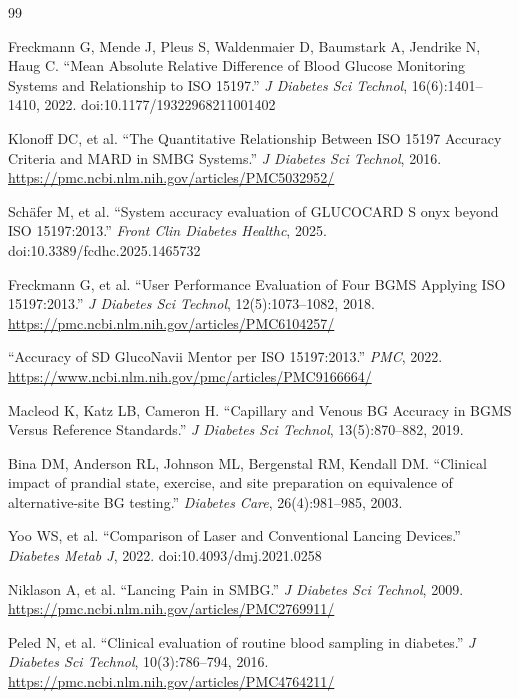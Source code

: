 \begin{thebibliography}{99}

Freckmann G, Mende J, Pleus S, Waldenmaier D, Baumstark A, Jendrike N, Haug C.
``Mean Absolute Relative Difference of Blood Glucose Monitoring Systems and Relationship to ISO 15197.''
\textit{J Diabetes Sci Technol}, 16(6):1401--1410, 2022.
doi:10.1177/19322968211001402

Klonoff DC, et al.
``The Quantitative Relationship Between ISO 15197 Accuracy Criteria and MARD in SMBG Systems.''
\textit{J Diabetes Sci Technol}, 2016.
\url{https://pmc.ncbi.nlm.nih.gov/articles/PMC5032952/}

Sch\"{a}fer M, et al.
``System accuracy evaluation of GLUCOCARD S onyx beyond ISO 15197:2013.''
\textit{Front Clin Diabetes Healthc}, 2025.
doi:10.3389/fcdhc.2025.1465732

Freckmann G, et al.
``User Performance Evaluation of Four BGMS Applying ISO 15197:2013.''
\textit{J Diabetes Sci Technol}, 12(5):1073--1082, 2018.
\url{https://pmc.ncbi.nlm.nih.gov/articles/PMC6104257/}

``Accuracy of SD GlucoNavii Mentor per ISO 15197:2013.''
\textit{PMC}, 2022.
\url{https://www.ncbi.nlm.nih.gov/pmc/articles/PMC9166664/}

Macleod K, Katz LB, Cameron H.
``Capillary and Venous BG Accuracy in BGMS Versus Reference Standards.''
\textit{J Diabetes Sci Technol}, 13(5):870--882, 2019.

Bina DM, Anderson RL, Johnson ML, Bergenstal RM, Kendall DM.
``Clinical impact of prandial state, exercise, and site preparation on equivalence of alternative-site BG testing.''
\textit{Diabetes Care}, 26(4):981--985, 2003.

Yoo WS, et al.
``Comparison of Laser and Conventional Lancing Devices.''
\textit{Diabetes Metab J}, 2022.
doi:10.4093/dmj.2021.0258

Niklason A, et al.
``Lancing Pain in SMBG.'' \textit{J Diabetes Sci Technol}, 2009.
\url{https://pmc.ncbi.nlm.nih.gov/articles/PMC2769911/}

Peled N, et al.
``Clinical evaluation of routine blood sampling in diabetes.''
\textit{J Diabetes Sci Technol}, 10(3):786--794, 2016.
\url{https://pmc.ncbi.nlm.nih.gov/articles/PMC4764211/}


\end{thebibliography}
